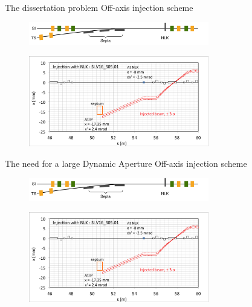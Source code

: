 \documentclass[aspectratio=169]{beamer}
\begin{document}
\begin{frame}{The dissertation problem}
    Off-axis injection scheme
    \begin{figure}
        \centering
        \includegraphics[width=0.7\textwidth]{injection.pdf}
    \end{figure}
    \pause
    \begin{figure}
        \centering
        \includegraphics[width=0.7\textwidth]{off_axis_injection.png}
    \end{figure}
\end{frame}
\begin{frame}{The need for a large Dynamic Aperture}
    Off-axis injection scheme
    \begin{figure}
        \centering
        \includegraphics[width=0.7\textwidth]{injection.pdf}
    \end{figure}
    \begin{figure}
        \centering
        \includegraphics[width=0.7\textwidth]{off_axis_injection.png}
    \end{figure}
\end{frame}
\end{document}
